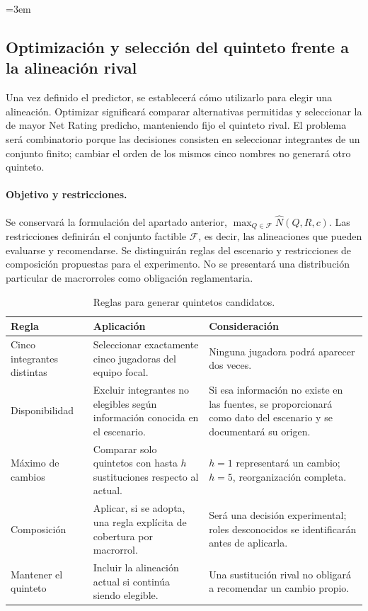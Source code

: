 \begingroup
\emergencystretch=3em
\subsection{Optimización y selección del quinteto frente a la alineación rival}
\label{subsec:optimizacion-fase2}
Una vez definido el predictor, se establecerá cómo utilizarlo para elegir una alineación. Optimizar significará comparar alternativas permitidas y seleccionar la de mayor Net Rating predicho, manteniendo fijo el quinteto rival. El problema será combinatorio porque las decisiones consisten en seleccionar integrantes de un conjunto finito; cambiar el orden de los mismos cinco nombres no generará otro quinteto.

\paragraph*{Objetivo y restricciones.}
Se conservará la formulación del apartado anterior, $\max_{Q\in\mathcal F}\widehat N(Q,R,c)$. Las restricciones definirán el conjunto factible $\mathcal F$, es decir, las alineaciones que pueden evaluarse y recomendarse. Se distinguirán reglas del escenario y restricciones de composición propuestas para el experimento. No se presentará una distribución particular de macrorroles como obligación reglamentaria.

\begin{table}[htbp]
\centering\small
\caption{Reglas para generar quintetos candidatos.}
\label{tab:restricciones-fase2}
\begin{tabularx}{\textwidth}{@{}p{3.2cm}XX@{}}
\toprule
\textbf{Regla}&\textbf{Aplicación}&\textbf{Consideración}\\\midrule
Cinco integrantes distintas & Seleccionar exactamente cinco jugadoras del equipo focal. & Ninguna jugadora podrá aparecer dos veces.\\
Disponibilidad & Excluir integrantes no elegibles según información conocida en el escenario. & Si esa información no existe en las fuentes, se proporcionará como dato del escenario y se documentará su origen.\\
Máximo de cambios & Comparar solo quintetos con hasta $h$ sustituciones respecto al actual. & $h=1$ representará un cambio; $h=5$, reorganización completa.\\
Composición & Aplicar, si se adopta, una regla explícita de cobertura por macrorrol. & Será una decisión experimental; roles desconocidos se identificarán antes de aplicarla.\\
Mantener el quinteto & Incluir la alineación actual si continúa siendo elegible. & Una sustitución rival no obligará a recomendar un cambio propio.\\
\bottomrule
\end{tabularx}
\end{table}

